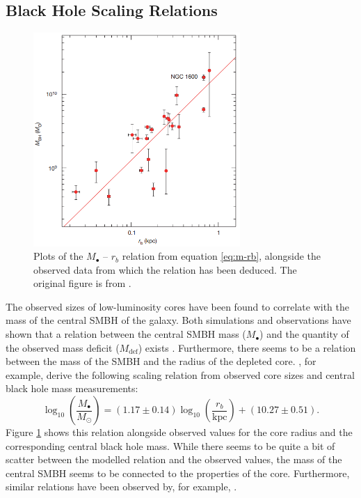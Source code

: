 \documentclass[english, oneside]{HYgradu}
\begin{document}
\subsection{Black Hole Scaling Relations}

\begin{figure}
	\centering
	\includegraphics[width=0.7\textwidth]{thomas_mbh-rb.png}
	\caption{Plots of the $M_\bullet$ – $r_b$ relation from equation \ref{eq:m-rb}, alongside the observed data from which the relation has been deduced. The original figure is from \cite{Thomas2016}.}
	\label{figure:m-rb}
\end{figure}

The observed sizes of low-luminosity cores have been found to correlate with the mass of the central SMBH of the galaxy. Both simulations and observations have shown that a relation between the central SMBH mass ($M_\bullet$) and the quantity of the observed mass deficit ($M_\mathrm{def}$) exists \citep{Graham2004, Merritt2006, Dullo2014}. Furthermore, there seems to be a relation between the mass of the SMBH and the radius of the depleted core. \cite{Thomas2016}, for example, derive the following scaling relation from observed core sizes and central black hole mass measurements:
\begin{equation}
\log_{10} \left( \frac{M_\bullet}{M_\odot} \right) = (1.17 \pm 0.14) \log_{10} \left( \frac{r_b}{\mathrm{kpc}} \right) + (10.27 \pm 0.51). \label{eq:m-rb}
\end{equation}
Figure \ref{figure:m-rb} shows this relation alongside observed values for the core radius and the corresponding central black hole mass. While there seems to be quite a bit of scatter between the modelled relation and the observed values, the mass of the central SMBH seems to be connected to the properties of the core. Furthermore, similar relations have been observed by, for example, \cite{Dullo2012}.
\end{document}
